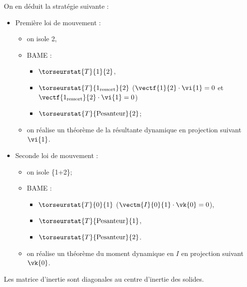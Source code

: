 On en déduit la stratégie suivante : 
\begin{itemize}
\item Première loi de mouvement : 
\begin{itemize}
\item on isole 2,
\item BAME : 
\begin{itemize}
\item $\torseurstat{T}{1}{2}$, 
\item $\torseurstat{T}{1_{\text{ressort}}}{2}$ ($\vectf{1}{2}\cdot \vi{1}= 0$ et $\vectf{1_{\text{ressort}}}{2}\cdot \vi{1}= 0$)
\item $\torseurstat{T}{\text{Pesanteur}}{2}$;
\end{itemize}
\item on réalise un théorème de la résultante dynamique en projection suivant $\vi{1}$. 
\end{itemize}
\item Seconde loi de mouvement : 
\begin{itemize}
\item on isole \{1+2\};
\item BAME :
\begin{itemize} 
\item $\torseurstat{T}{0}{1}$ ($\vectm{I}{0}{1}\cdot \vk{0}= 0$), 
\item $\torseurstat{T}{\text{Pesanteur}}{1}$,
\item  $\torseurstat{T}{\text{Pesanteur}}{2}$.
\end{itemize}
\item on réalise un théorème du moment dynamique en $I$ en projection suivant $\vk{0}$. 
\end{itemize}
\end{itemize}
\else
\fi

\ifcolle
Les matrice d'inertie sont diagonales au centre d'inertie des solides.
\else
\fi

\ifprof
\else


\fi